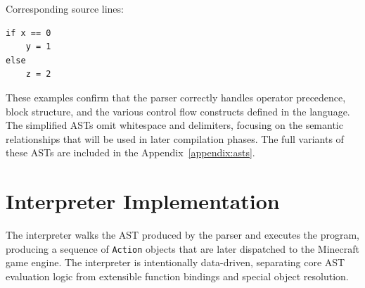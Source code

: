 \begin{center}
\noindent{}
\end{center}

\noindent Corresponding source lines:
\begin{lstlisting}
if x == 0
    y = 1
else
    z = 2
\end{lstlisting}

These examples confirm that the parser correctly handles operator precedence, block structure, and the various control flow constructs defined in the language. The simplified ASTs omit whitespace and delimiters, focusing on the semantic relationships that will be used in later compilation phases.
The full variants of these ASTs are included in the Appendix~\ref{appendix:asts}.

\section{Interpreter Implementation}

The interpreter walks the AST produced by the parser and executes the program, producing a sequence of \texttt{Action} objects that are later dispatched to the Minecraft game engine.
The interpreter is intentionally data-driven, separating core AST evaluation logic from extensible function bindings and special object resolution.

